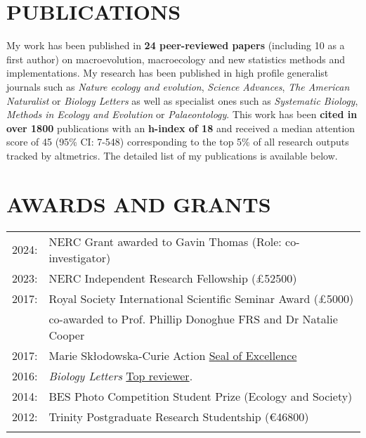 \documentclass[10pt,a4paper]{article}
\begin{document}
{%
\section{PUBLICATIONS}
My work has been published in \textbf{24 peer-reviewed papers} (including 10 as a first author) on macroevolution, macroecology and new statistics methods and implementations.
My research has been published in high profile generalist journals such as \textit{Nature ecology and evolution}, \textit{Science Advances}, \textit{The American Naturalist} or \textit{Biology Letters} as well as specialist ones such as \textit{Systematic Biology}, \textit{Methods in Ecology and Evolution} or \textit{Palaeontology}.
This work has been \textbf{cited in over 1800} %
publications with an \textbf{h-index of 18} %
and received a median attention score of 45 (95\% CI: 7-548) %
corresponding to the top 5\% of all research outputs tracked by altmetrics.
The detailed list of my publications is available below.

\bigskip




\section{AWARDS AND GRANTS}
\begin{tabular}{ll}
2024: & NERC Grant awarded to Gavin Thomas (Role: co-investigator)\\
2023: & NERC Independent Research Fellowship (\pounds52500)\\
2017: & Royal Society International Scientific Seminar Award (\pounds5000)\\
      & co-awarded to Prof. Phillip Donoghue FRS and Dr Natalie Cooper\\
2017: & Marie Sk\l{}odowska-Curie Action \href{https://ec.europa.eu/research/soe/index.cfm?pg=what}{Seal of Excellence}\\
2016: & \textit{Biology Letters} \href{http://blogs.royalsociety.org/publishing/biology-letters-top-reviewers-from-2016/}{Top reviewer}.\\
2014: & BES Photo Competition Student Prize (Ecology and Society)\\
2012: & Trinity Postgraduate Research Studentship (\euro46800)\\
& \\ 
\end{tabular}
\bigskip


}
\end{document}
